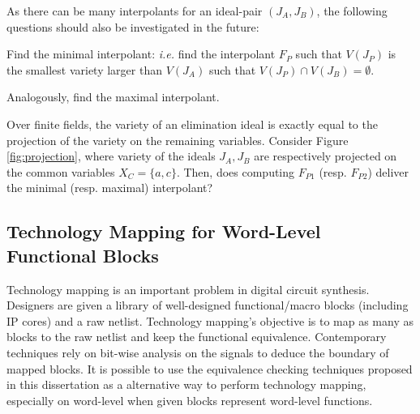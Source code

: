 As there can be many interpolants for an ideal-pair $(J_A, J_B)$, 
the following questions should also be investigated in the future:
\bi
\item Find the minimal interpolant: {\it i.e.} find the interpolant $F_P$
  such that $V(J_P)$ is the smallest variety larger than $V(J_A)$ such
  that $V(J_P) \cap V(J_B) = \emptyset$.
\item Analogously, find the maximal interpolant. 
\item Over finite fields, the variety of an elimination ideal is
  exactly equal to the projection of the variety on the remaining
  variables. Consider Figure \ref{fig:projection}, where variety of the
  ideals $J_A, J_B$ are respectively projected on the common variables
  $X_C = \{a, c\}$. Then, does computing $F_{P1}$ (resp. $F_{P2}$) 
  deliver the minimal (resp. maximal) interpolant?
\ei

\begin{figure}[h]
\end{figure}

% 

\subsection{Technology Mapping for Word-Level Functional Blocks}
Technology mapping is an important problem in digital circuit synthesis.
Designers are given a library of well-designed functional/macro blocks (including IP cores) and a raw netlist.
Technology mapping's objective is to map as many as blocks to the raw netlist and 
keep the functional equivalence. Contemporary techniques rely on bit-wise 
analysis on the signals to deduce the boundary of mapped blocks.
It is possible to use the equivalence checking techniques proposed in this dissertation 
as a alternative way to perform technology mapping, especially on word-level when 
given blocks represent word-level functions.

